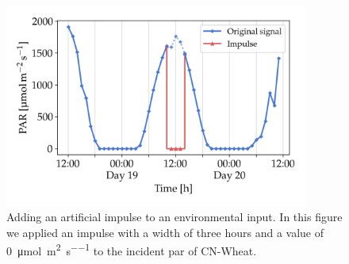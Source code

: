 \begin{figure}[]
	\centering
    \includegraphics[width=10cm]{img/cn_impulse.png}
	\caption[Adding an artificial impulse to an environmental input.]{Adding an artificial impulse to an environmental input. In this figure we applied an impulse with a width of three hours and a value of \SI{0}{\micro\mole\per\square\meter\per\second} to the incident \acrshort{par} of CN-Wheat.}
	\label{fig:methods-impulse}
\end{figure}